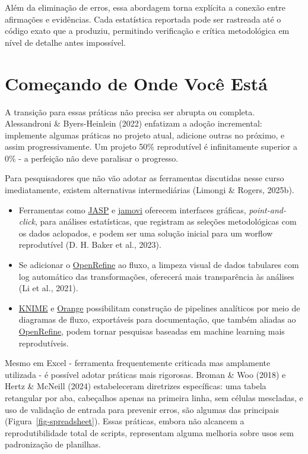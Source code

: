 \documentclass[
  a4paper,
]{book}
\providecommand{\tightlist}{%
  \setlength{\itemsep}{0pt}\setlength{\parskip}{0pt}}\usepackage{longtable,booktabs,array}
\begin{document}
Além da eliminação de erros, essa abordagem torna explícita a conexão
entre afirmações e evidências. Cada estatística reportada pode ser
rastreada até o código exato que a produziu, permitindo verificação e
crítica metodológica em nível de detalhe antes impossível.

\section{Começando de Onde Você
Está}\label{comeuxe7ando-de-onde-vocuxea-estuxe1}

A transição para essas práticas não precisa ser abrupta ou completa.
Alessandroni \& Byers-Heinlein (2022) enfatizam a adoção incremental:
implemente algumas práticas no projeto atual, adicione outras no
próximo, e assim progressivamente. Um projeto 50\% reprodutível é
infinitamente superior a 0\% - a perfeição não deve paralisar o
progresso.

Para pesquisadores que não vão adotar as ferramentas discutidas nesse
curso imediatamente, existem alternativas intermediárias (Limongi \&
Rogers, 2025b).

\begin{itemize}
\tightlist
\item
  Ferramentas como \href{https://jasp-stats.org/}{JASP} e
  \href{https://www.jamovi.org/}{jamovi} oferecem interfaces gráficas,
  \emph{point-and-click}, para análises estatísticas, que registram as
  seleções metodológicas com os dados aclopados, e podem ser uma solução
  inicial para um worflow reprodutível (D. H. Baker et al., 2023).
\item
  Se adicionar o \href{https://openrefine.org/}{OpenRefine} ao fluxo, a
  limpeza visual de dados tabulares com log automático das
  transformações, oferecerá mais transparência às análises (Li et al.,
  2021).
\item
  \href{https://www.knime.com/}{KNIME} e
  \href{https://orangedatamining.com/}{Orange} possibilitam construção
  de pipelines analíticos por meio de diagramas de fluxo, exportáveis
  para documentação, que também aliadas ao
  \href{https://openrefine.org/}{OpenRefine}, podem tornar pesquisas
  baseadas em machine learning mais reprodutíveis.
\end{itemize}

Mesmo em Excel - ferramenta frequentemente criticada mas amplamente
utilizada - é possível adotar práticas mais rigorosas. Broman \& Woo
(2018) e Hertz \& McNeill (2024) estabeleceram diretrizes específicas:
uma tabela retangular por aba, cabeçalhos apenas na primeira linha, sem
células mescladas, e uso de validação de entrada para prevenir erros,
são algumas das principais (Figura~\ref{fig-spreadsheet}). Essas
práticas, embora não alcancem a reprodutibilidade total de scripts,
representam alguma melhoria sobre usos sem padronização de planilhas.
\end{document}
